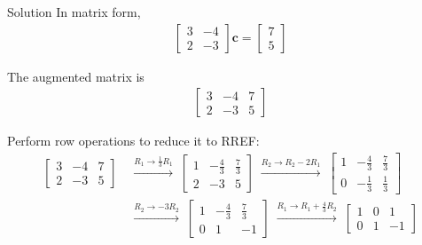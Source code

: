 \documentclass{beamer}
\begin{document}
\begin{frame}{Solution}
In matrix form,
\begin{align}
\begin{bmatrix}
3 & -4 \\
2 & -3
\end{bmatrix}
\mathbf{c} =
\begin{bmatrix}
7 \\
5
\end{bmatrix}
\end{align}

The augmented matrix is
\begin{align}
\left[\begin{array}{cc|c}
3 & -4 & 7 \\
2 & -3 & 5
\end{array}\right]
\end{align}

Perform row operations to reduce it to RREF:
\begin{align}
\left[\begin{array}{cc|c}
3 & -4 & 7 \\
2 & -3 & 5
\end{array}\right]
&\;\xrightarrow{R_1 \rightarrow \frac{1}{3} R_1}\;
\left[\begin{array}{cc|c}
1 & -\frac{4}{3} & \frac{7}{3} \\
2 & -3 & 5
\end{array}\right]
\;\xrightarrow{R_2 \rightarrow R_2 - 2R_1}\;
\left[\begin{array}{cc|c}
1 & -\frac{4}{3} & \frac{7}{3} \\
0 & -\frac{1}{3} & \frac{1}{3}
\end{array}\right] \\
&\;\xrightarrow{R_2 \rightarrow -3 R_2}\;
\left[\begin{array}{cc|c}
1 & -\frac{4}{3} & \frac{7}{3} \\
0 & 1 & -1
\end{array}\right]
\;\xrightarrow{R_1 \rightarrow R_1 + \frac{4}{3} R_2}\;
\left[\begin{array}{cc|c}
1 & 0 & 1 \\
0 & 1 & -1
\end{array}\right]
\end{align}
\end{frame}
\end{document}
